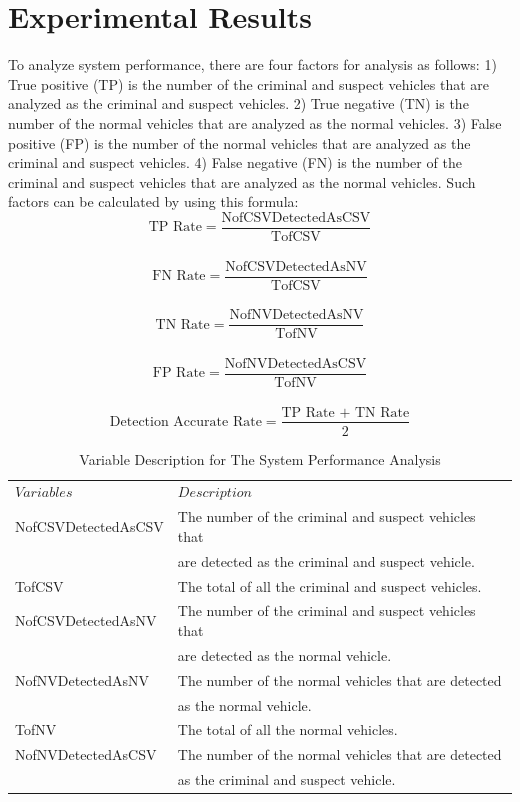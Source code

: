 \documentclass{llncs}
\begin{document}
\section{Experimental Results}
To analyze system performance, there are four factors for analysis as follows:
1) True positive (TP) is the number of the criminal and suspect vehicles that are analyzed as the criminal and suspect vehicles.  
2) True negative (TN) is the number of the normal vehicles that are analyzed as the normal vehicles. 
3) False positive (FP) is the number of the normal vehicles that are analyzed as the criminal and suspect vehicles. 
4) False negative (FN) is the number of the criminal and suspect vehicles that are analyzed as the normal vehicles. 
Such factors can be calculated by using this formula:\\
$$ \text{TP Rate} =  \frac{\text{NofCSVDetectedAsCSV}}{\text{TofCSV}} $$\\
$$ \text{FN Rate} =  \frac{\text{NofCSVDetectedAsNV}}{\text{TofCSV}} $$\\
$$ \text{TN Rate} =  \frac{\text{NofNVDetectedAsNV}}{\text{TofNV}} $$\\ 
$$ \text{FP Rate} =  \frac{\text{NofNVDetectedAsCSV}}{\text{TofNV}} $$\\
$$ \text{Detection Accurate Rate} =  \frac{\text{TP Rate + TN Rate}}{\text{2}} $$

\begin{table}
\caption{Variable Description for The System Performance Analysis}
\label{table_variableSysPerf}
\begin{center}
\renewcommand{\arraystretch}{1.4}
\setlength\tabcolsep{3pt}
\begin{tabular}{ll}
\hline\noalign{\smallskip}
$Variables$ & $Description$\\
\noalign{\smallskip}
\hline
\noalign{\smallskip}
NofCSVDetectedAsCSV & The number of the criminal and suspect vehicles that \\ & are detected as the criminal and suspect vehicle.\\
TofCSV & The total of all the criminal and suspect vehicles.\\
NofCSVDetectedAsNV & The number of the criminal and suspect vehicles that \\ & are detected as the normal vehicle.\\
NofNVDetectedAsNV & The number of the normal vehicles that are detected \\ & as the normal vehicle.\\
TofNV & The total of all the normal vehicles.\\
NofNVDetectedAsCSV & The number of the normal vehicles that are detected \\ & as the criminal and suspect vehicle.\\
\hline
\end{tabular}
\end{center}
\end{table}
\end{document}
